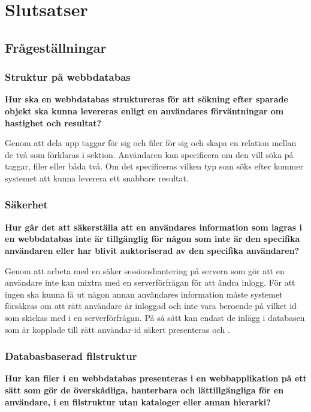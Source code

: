 \chapter{Slutsatser}

\section{Frågeställningar}

\subsection{Struktur på webbdatabas}

\textbf{Hur ska en webbdatabas struktureras för att sökning efter sparade objekt
ska kunna levereras enligt en användares förväntningar om hastighet och
resultat?}

Genom att dela upp taggar för sig och filer för sig och skapa en relation mellan
de två som förklaras i sektion. Användaren kan specificera om den vill söka på
taggar, filer eller båda två. Om det specificeras vilken typ som söks efter
kommer systemet att kunna leverera ett snabbare resultat.

\subsection{Säkerhet}

\textbf{Hur går det att säkerställa att en användares information som lagras i
en webbdatabas inte är tillgänglig för någon som inte är den specifika
användaren eller har blivit  auktoriserad av den specifika användaren?}

Genom att arbeta med en säker sessionshantering på servern som gör att en
användare inte kan mixtra med en serverförfrågan för att ändra inlogg. För att
ingen ska kunna få ut någon annan användares information måste systemet
försäkras om att rätt användare är inloggad och inte vara beroende på vilket id
som skickas med i en serverförfrågan. På så sätt kan endast de inlägg i
databasen som är kopplade till rätt användar-id säkert presenteras och .

\subsection{Databasbaserad filstruktur}

\textbf{Hur kan filer i en webbdatabas presenteras i en webbapplikation på ett
sätt som gör de överskådliga,  hanterbara och lättillgängliga för en användare,
i en filstruktur utan kataloger eller annan hierarki?}

